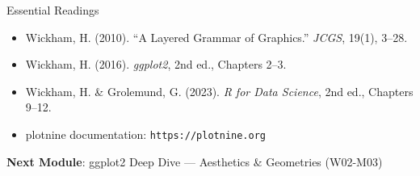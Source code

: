 \documentclass[10pt]{beamer}
\begin{document}
\begin{frame}{Essential Readings}
  \begin{itemize}
    \item Wickham, H. (2010). ``A Layered Grammar of Graphics.'' \emph{JCGS}, 19(1), 3--28.
    \item Wickham, H. (2016). \emph{ggplot2}, 2nd ed., Chapters 2--3.
    \item Wickham, H. \& Grolemund, G. (2023). \emph{R for Data Science}, 2nd ed., Chapters 9--12.
    \item plotnine documentation: \texttt{https://plotnine.org}
  \end{itemize}
  \vspace{6pt}
  \textbf{Next Module}: ggplot2 Deep Dive --- Aesthetics \& Geometries (W02-M03)
\end{frame}
\end{document}
